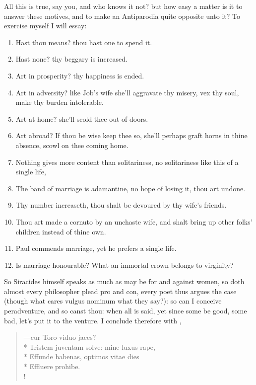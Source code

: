 All this is true, say you, and who knows it not? but how easy a matter
is it to answer these motives, and to make an Antiparodia quite
opposite unto it? To exercise myself I will essay:

\begin{enumerate}
  \item Hast thou means? thou hast one to spend it.
  \item Hast none? thy beggary is increased.
  \item Art in prosperity? thy happiness is ended.
  \item Art in adversity? like Job's wife she'll aggravate thy misery, vex thy soul, make thy burden intolerable.
  \item Art at home? she'll scold thee out of doors.
  \item Art abroad? If thou be wise keep thee so, she'll perhaps graft horns in thine absence, scowl on thee coming home.
  \item Nothing gives more content than solitariness, no solitariness like this of a single life,
  \item The band of marriage is adamantine, no hope of losing it, thou art undone.
  \item Thy number increaseth, thou shalt be devoured by thy wife's friends.
  \item Thou art made a cornuto by an unchaste wife, and shalt bring up other folks' children instead of thine own.
  \item Paul commends marriage, yet he prefers a single life.
  \item Is marriage honourable? What an immortal crown belongs to virginity?
\end{enumerate}

So Siracides himself speaks as much as may be for and against women, so
doth almost every philosopher plead pro and con, every poet thus argues
the case (though what cares vulgus nominum what they say?): so can I
conceive peradventure, and so canst thou: when all is said, yet since
some be good, some bad, let's put it to the venture. I conclude
therefore with \Seneca{}{},

\begin{latin}%
\begin{verse}%
---cur Toro viduo jaces?\\*
Tristem juventam solve: mine luxus rape,\\*
Effunde habenas, optimos vitae dies\\*
Effluere prohibe.\\!
\end{verse}%
\end{latin}%

